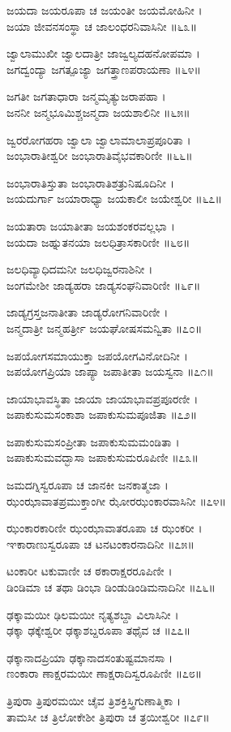ಜಯದಾ ಜಯರೂಪಾ ಚ ಜಯಂತೀ ಜಯಮೋಹಿನೀ ।\\
ಜಯಾ ಜೀವನಸಂಸ್ಥಾ ಚ ಜಾಲಂಧರನಿವಾಸಿನೀ ॥೬೩॥

ಜ್ವಾಲಾಮುಖೀ ಜ್ವಾಲದಾತ್ರೀ ಜಾಜ್ವಲ್ಯದಹನೋಪಮಾ ।\\
ಜಗದ್ವಂದ್ಯಾ ಜಗತ್ಪೂಜ್ಯಾ ಜಗತ್ತ್ರಾಣಪರಾಯಣಾ ॥೬೪॥

ಜಗತೀ ಜಗತಾಧಾರಾ ಜನ್ಮಮೃತ್ಯುಜರಾಪಹಾ ।\\
ಜನನೀ ಜನ್ಮಭೂಮಿಶ್ಚಜನ್ಮದಾ ಜಯಶಾಲಿನೀ ॥೬೫॥

ಜ್ವರರೋಗಹರಾ ಜ್ವಾಲಾ ಜ್ವಾಲಾಮಾಲಾಪ್ರಪೂರಿತಾ ।\\
ಜಂಭಾರಾತೀಶ್ವರೀ ಜಂಭಾರಾತಿವೈಭವಕಾರಿಣೀ ॥೬೬॥

ಜಂಭಾರಾತಿಸ್ತುತಾ ಜಂಭಾರಾತಿಶತ್ರುನಿಷೂದಿನೀ ।\\
ಜಯದುರ್ಗಾ ಜಯಾರಾಧ್ಯಾ ಜಯಕಾಲೀ ಜಯೇಶ್ವರೀ ॥೬೭॥

ಜಯತಾರಾ ಜಯಾತೀತಾ ಜಯಶಂಕರವಲ್ಲಭಾ ।\\
ಜಯದಾ ಜಹ್ನುತನಯಾ ಜಲಧಿತ್ರಾಸಕಾರಿಣೀ ॥೬೮॥

ಜಲಧಿವ್ಯಾಧಿದಮನೀ ಜಲಧಿಜ್ವರನಾಶಿನೀ ।\\
ಜಂಗಮೇಶೀ ಜಾಡ್ಯಹರಾ ಜಾಡ್ಯಸಂಘನಿವಾರಿಣೀ ॥೬೯॥

ಜಾಡ್ಯಗ್ರಸ್ತಜನಾತೀತಾ ಜಾಡ್ಯರೋಗನಿವಾರಿಣೀ ।\\
ಜನ್ಮದಾತ್ರೀ ಜನ್ಮಹರ್ತ್ರೀ ಜಯಘೋಷಸಮನ್ವಿತಾ ॥೭೦॥

ಜಪಯೋಗಸಮಾಯುಕ್ತಾ ಜಪಯೋಗವಿನೋದಿನೀ ।\\
ಜಪಯೋಗಪ್ರಿಯಾ ಜಾಪ್ಯಾ ಜಪಾತೀತಾ ಜಯಸ್ವನಾ ॥೭೧॥

ಜಾಯಾಭಾವಸ್ಥಿತಾ ಜಾಯಾ ಜಾಯಾಭಾವಪ್ರಪೂರಣೀ ।\\
ಜಪಾಕುಸುಮಸಂಕಾಶಾ ಜಪಾಕುಸುಮಪೂಜಿತಾ ॥೭೨॥

ಜಪಾಕುಸುಮಸಂಪ್ರೀತಾ ಜಪಾಕುಸುಮಮಂಡಿತಾ ।\\
ಜಪಾಕುಸುಮವದ್ಭಾಸಾ ಜಪಾಕುಸುಮರೂಪಿಣೀ ॥೭೩॥

ಜಮದಗ್ನಿಸ್ವರೂಪಾ ಚ ಜಾನಕೀ ಜನಕಾತ್ಮಜಾ ।\\
ಝಂಝಾವಾತಪ್ರಮುಕ್ತಾಂಗೀ ಝೋರಝಂಕಾರವಾಸಿನೀ ॥೭೪॥

ಝಂಕಾರಕಾರಿಣೀ ಝಂಝಾವಾತರೂಪಾ ಚ ಝಂಕರೀ ।\\
ಞಕಾರಾಣುಸ್ವರೂಪಾ ಚ ಟನಟಂಕಾರನಾದಿನೀ ॥೭೫॥

ಟಂಕಾರೀ ಟಕುವಾಣೀ ಚ ಠಕಾರಾಕ್ಷರರೂಪಿಣೀ ।\\
ಡಿಂಡಿಮಾ ಚ ತಥಾ ಡಿಂಭಾ ಡಿಂಡುಡಿಂಡಿಮನಾದಿನೀ ॥೭೬॥

ಢಕ್ಕಾಮಯೀ ಢಿಲಮಯೀ ನೃತ್ಯಶಬ್ದಾ ವಿಲಾಸಿನೀ ।\\
ಢಕ್ಕಾ ಢಕ್ಕೇಶ್ವರೀ ಢಕ್ಕಾಶಬ್ದರೂಪಾ ತಥೈವ ಚ ॥೭೭॥

ಢಕ್ಕಾನಾದಪ್ರಿಯಾ ಢಕ್ಕಾನಾದಸಂತುಷ್ಟಮಾನಸಾ ।\\
ಣಂಕಾರಾ ಣಾಕ್ಷರಮಯೀ ಣಾಕ್ಷರಾದಿಸ್ವರೂಪಿಣೀ ॥೭೮॥

ತ್ರಿಪುರಾ ತ್ರಿಪುರಮಯೀ ಚೈವ ತ್ರಿಶಕ್ತಿಸ್ತ್ರಿಗುಣಾತ್ಮಿಕಾ ।\\
ತಾಮಸೀ ಚ ತ್ರಿಲೋಕೇಶೀ ತ್ರಿಪುರಾ ಚ ತ್ರಯೀಶ್ವರೀ ॥೭೯॥

